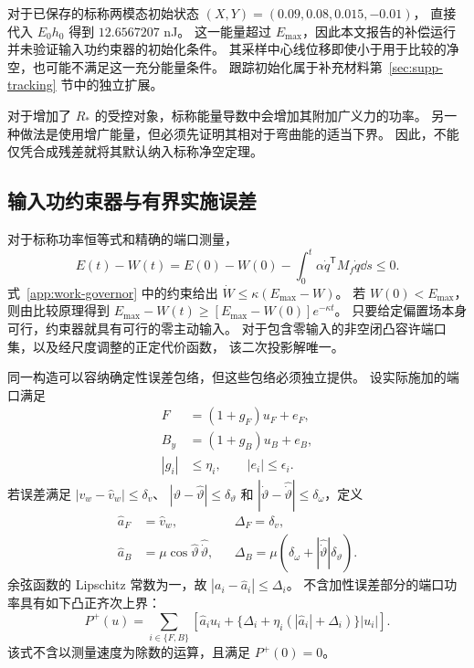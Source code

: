 对于已保存的标称两模态初始状态 $(X,Y)=(0.09,0.08,0.015,-0.01)$，
直接代入 $E_0h_0$ 得到 $12.6567207$ nJ。
这一能量超过 $E_{\max}$，因此本文报告的补偿运行并未验证输入功约束器的初始化条件。
其采样中心线位移即使小于用于比较的净空，也可能不满足这一充分能量条件。
跟踪初始化属于补充材料第~\ref{sec:supp-tracking} 节中的独立扩展。

对于增加了 $R_*$ 的受控对象，标称能量导数中会增加其附加广义力的功率。
另一种做法是使用增广能量，但必须先证明其相对于弯曲能的适当下界。
因此，不能仅凭合成残差就将其默认纳入标称净空定理。

\subsection{输入功约束器与有界实施误差}
\label{sm:work}
对于标称功率恒等式和精确的端口测量，
\begin{equation}
 E(t)-W(t)=E(0)-W(0)
             -\int_0^t\alpha\dot q^{\mathsf T}M_f\dot q\dd s\le0.
 \label{sm:work-ledger}
\end{equation}
式~\eqref{app:work-governor} 中的约束给出 $\dot W\le\kappa(E_{\max}-W)$。
若 $W(0)<E_{\max}$，则由比较原理得到
$E_{\max}-W(t)\ge[E_{\max}-W(0)]e^{-\kappa t}$。
只要给定偏置场本身可行，约束器就具有可行的零主动输入。
对于包含零输入的非空闭凸容许端口集，以及经尺度调整的正定代价函数，
该二次投影解唯一。

同一构造可以容纳确定性误差包络，但这些包络必须独立提供。
设实际施加的端口满足
\begin{align}
 F&=(1+g_F)u_F+e_F,\nonumber\\
 B_y&=(1+g_B)u_B+e_B,\nonumber\\
 |g_i|&\le\eta_i,\qquad |e_i|\le\epsilon_i.
 \label{sm:port-errors}
\end{align}
若误差满足 $|v_w-\widehat v_w|\le\delta_v$、
$|\vartheta-\widehat\vartheta|\le\delta_\vartheta$ 和
$|\dot\vartheta-\widehat{\dot\vartheta}|\le\delta_\omega$，定义
\begin{align}
 \widehat a_F&=\widehat v_w,\qquad &&\Delta_F=\delta_v,\nonumber\\
 \widehat a_B&=\mu\cos\widehat\vartheta\,\widehat{\dot\vartheta},
 &&\Delta_B=\mu(\delta_\omega+
                   |\widehat{\dot\vartheta}|\delta_\vartheta).
 \label{sm:power-estimation}
\end{align}
余弦函数的 Lipschitz 常数为一，故 $|a_i-\widehat a_i|\le\Delta_i$。
不含加性误差部分的端口功率具有如下凸正齐次上界：
\begin{equation}
 P^+(u)=\sum_{i\in\{F,B\}}
 \left[\widehat a_i u_i+
   \{\Delta_i+\eta_i(|\widehat a_i|+\Delta_i)\}|u_i|\right].
 \label{sm:power-envelope}
\end{equation}
该式不含以测量速度为除数的运算，且满足 $P^+(0)=0$。

